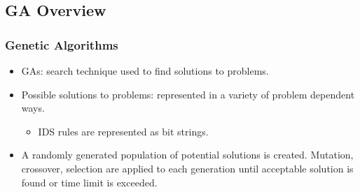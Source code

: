 \documentclass{beamer}
\newcommand{\linespace}{\vskip 0.25cm}
\begin{document}
\subsection{GA Overview}
\begin{frame}
  \frametitle{Genetic Algorithms}
	\begin{itemize}
		\item GAs: search technique used to find solutions to problems.
        \item Possible solutions to problems: represented in a variety of problem dependent ways.
        
        \begin{itemize}
        	\item IDS rules are represented as bit strings.
        \end{itemize}
        
        \linespace
        \item A randomly generated population of potential solutions is created. Mutation, crossover, selection are applied to each generation until acceptable solution is found or time limit is exceeded.
	\end{itemize}
\end{frame}
\end{document}
